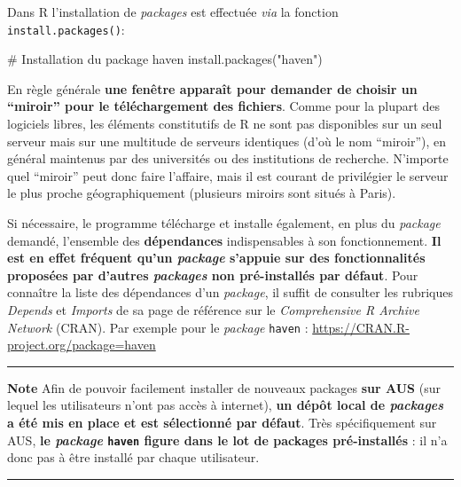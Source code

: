 \documentclass[12pt,twosided, notitlepage]{book}
\newenvironment{Shaded}{}{}
\newcommand{\KeywordTok}[1]{\textcolor[rgb]{0.00,0.00,1.00}{{#1}}}
\newcommand{\StringTok}[1]{\textcolor[rgb]{0.00,0.50,0.50}{{#1}}}
\newcommand{\CommentTok}[1]{\textcolor[rgb]{0.00,0.50,0.00}{{#1}}}
\newcommand{\NormalTok}[1]{{#1}}
\renewenvironment{Shaded}{\begin{snugshade}}{\end{snugshade}}
\begin{document}
Dans R l'installation de \emph{packages} est effectuée \emph{via} la
fonction \texttt{install.packages()}:

\begin{Shaded}
\begin{Highlighting}[]
\CommentTok{# Installation du package haven}
\KeywordTok{install.packages}\NormalTok{(}\StringTok{"haven"}\NormalTok{)}
\end{Highlighting}
\end{Shaded}

En règle générale \textbf{une fenêtre apparaît pour demander de choisir
un \enquote{miroir} pour le téléchargement des fichiers}. Comme pour la
plupart des logiciels libres, les éléments constitutifs de R ne sont pas
disponibles sur un seul serveur mais sur une multitude de serveurs
identiques (d'où le nom \enquote{miroir}), en général maintenus par des
universités ou des institutions de recherche. N'importe quel
\enquote{miroir} peut donc faire l'affaire, mais il est courant de
privilégier le serveur le plus proche géographiquement (plusieurs
miroirs sont situés à Paris).

Si nécessaire, le programme télécharge et installe également, en plus du
\emph{package} demandé, l'ensemble des \textbf{dépendances}
indispensables à son fonctionnement. \textbf{Il est en effet fréquent
qu'un \emph{package} s'appuie sur des fonctionnalités proposées par
d'autres \emph{packages} non pré-installés par défaut}. Pour connaître
la liste des dépendances d'un \emph{package}, il suffit de consulter les
rubriques \emph{Depends} et \emph{Imports} de sa page de référence sur
le \emph{Comprehensive R Archive Network} (CRAN). Par exemple pour le
\emph{package} \texttt{haven} :
\url{https://CRAN.R-project.org/package=haven}

\begin{center}\rule{0.5\linewidth}{\linethickness}\end{center}

\textbf{Note} Afin de pouvoir facilement installer de nouveaux packages
\textbf{sur AUS} (sur lequel les utilisateurs n'ont pas accès à
internet), \textbf{un dépôt local de \emph{packages} a été mis en place
et est sélectionné par défaut}. Très spécifiquement sur AUS, \textbf{le
\emph{package} \texttt{haven} figure dans le lot de packages
pré-installés} : il n'a donc pas à être installé par chaque utilisateur.

\begin{center}\rule{0.5\linewidth}{\linethickness}\end{center}
\end{document}
